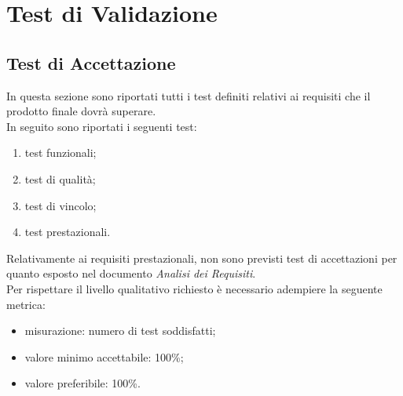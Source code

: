 \section{Test di Validazione}

\subsection{Test di Accettazione}
	In questa sezione sono riportati tutti i test definiti relativi ai requisiti che il prodotto finale dovrà superare.\\
	In seguito sono riportati i seguenti test:
	\begin{enumerate}
		\item test funzionali;
		\item test di qualità;
		\item test di vincolo;
		\item test prestazionali.
	\end{enumerate}
	Relativamente ai requisiti prestazionali, non sono previsti test di accettazioni per quanto esposto nel documento \textit{Analisi dei Requisiti}. \\
	Per rispettare il livello qualitativo richiesto è necessario adempiere la seguente metrica:
	\begin{itemize}
		\item misurazione: numero di test soddisfatti;
		\item valore minimo accettabile: 100\%;
		\item valore preferibile: 100\%.
	\end{itemize}
	
	
	
	\pagebreak
	